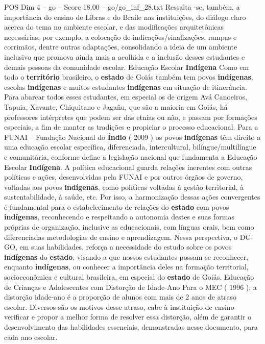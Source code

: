 \begin{textsample}{POS Dim 4 – go – Score 18.00 – go/go\_inf\_28.txt}
Ressalta -se, também, a importância do ensino de Libras e do Braile nas instituições, do diálogo claro acerca do tema no ambiente escolar, e das modificações arquitetônicas necessárias, por exemplo, a colocação de indicações/sinalizações, rampas e corrimãos, dentre outras adaptações, consolidando a ideia de um ambiente inclusivo que promova ainda mais a acolhida e a inclusão desses estudantes e demais pessoas da comunidade escolar.
Educação Escolar \textbf{Indígena} Como em todo o \textbf{território} brasileiro, o \textbf{estado} de Goiás também tem povos \textbf{indígenas}, escolas \textbf{indígenas} e muitos estudantes \textbf{indígenas} em situação de itinerância.
Para abarcar todos esses estudantes, em especial os de origem Avá Canoeiros, Tapuia, Xavante, Chiquitano e Jagañu, que são a maioria em Goiás, há professores intérpretes que podem ser das etnias ou não, e passam por formações especiais, a fim de manter as tradições e propiciar o processo educacional.
Para a FUNAI – Fundação Nacional do \textbf{Índio} ( 2009 ) os povos \textbf{indígenas} têm direito a uma educação escolar específica, diferenciada, intercultural, bilíngue/multilíngue e comunitária, conforme define a legislação nacional que fundamenta a Educação Escolar \textbf{Indígena}.
A política educacional guarda relações inerentes com outras políticas e ações, desenvolvidas pela FUNAI e por outros órgãos de governo, voltadas aos povos \textbf{indígenas}, como políticas voltadas à gestão territorial, à sustentabilidade, à saúde, etc.
Por isso, a harmonização dessas ações convergentes é fundamental para o estabelecimento de relações do \textbf{estado} com povos \textbf{indígenas}, reconhecendo e respeitando a autonomia destes e suas formas próprias de organização, inclusive as educacionais, com línguas orais, bem como diferenciadas metodologias de ensino e aprendizagem.
Nessa perspectiva, o DC-GO, em suas habilidades, reforça a necessidade do estudo sobre os povos \textbf{indígenas} do \textbf{estado}, visando a que nossos estudantes possam se reconhecer, enquanto \textbf{indígenas}, ou conhecer a importância deles na formação territorial, socioeconômica e cultural brasileira, em especial do \textbf{estado} de Goiás.
Educação de Crianças e Adolescentes com Distorção de Idade-Ano Para o MEC ( 1996 ), a distorção idade-ano é a proporção de alunos com mais de 2 anos de atraso escolar.
Diversos são os motivos desse atraso, cabe à instituição de ensino verificar e propor a melhor forma de resolver essa distorção, além de garantir o desenvolvimento das habilidades essenciais, demonstradas nesse documento, para cada ano escolar.

\end{textsample}
